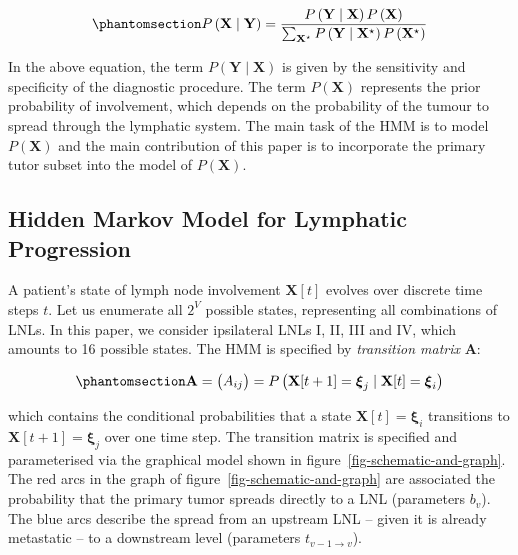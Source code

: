 \documentclass[11pt,twocolumn,twoside]{article}
\begin{document}
\begin{equation}\phantomsection\label{eq-bayes-law}{
P \left( \mathbf{X} \mid \mathbf{Y} \right) = \frac{P \left( \mathbf{Y} \mid \mathbf{X} \right) P \left( \mathbf{X} \right)}{\sum_{\mathbf{X}^\star} P \left( \mathbf{Y} \mid \mathbf{X}^\star \right) P \left( \mathbf{X}^\star \right)}
}\end{equation}

In the above equation, the term
\(P \left( \mathbf{Y} \mid \mathbf{X} \right)\) is given by the
sensitivity and specificity of the diagnostic procedure. The term
\(P \left( \mathbf{X} \right)\) represents the prior probability of
involvement, which depends on the probability of the tumour to spread
through the lymphatic system. The main task of the HMM is to model
\(P \left( \mathbf{X} \right)\) and the main contribution of this paper
is to incorporate the primary tutor subset into the model of
\(P \left( \mathbf{X} \right)\).

\subsection{Hidden Markov Model for Lymphatic
Progression}\label{sec-hmm}

A patient's state of lymph node involvement \(\mathbf{X}[t]\) evolves
over discrete time steps \(t\). Let us enumerate all \(2^V\) possible
states, representing all combinations of LNLs. In this paper, we
consider ipsilateral LNLs I, II, III and IV, which amounts to 16
possible states. The HMM is specified by \emph{transition matrix}
\(\mathbf{A}\):

\begin{equation}\phantomsection\label{eq-transition-matrix}{
\mathbf{A} = \begin{pmatrix} A_{ij} \end{pmatrix} = P \left( \mathbf{X}[t+1] = \boldsymbol{\xi}_j \mid \mathbf{X}[t] = \boldsymbol{\xi}_i \right)
}\end{equation}

which contains the conditional probabilities that a state
\(\mathbf{X}[t]=\boldsymbol{\xi}_i\) transitions to
\(\mathbf{X}[t+1]=\boldsymbol{\xi}_j\) over one time step. The
transition matrix is specified and parameterised via the graphical model
shown in figure~\ref{fig-schematic-and-graph}. The red arcs in the graph
of figure~\ref{fig-schematic-and-graph} are associated the probability
that the primary tumor spreads directly to a LNL (parameters \(b_v\)).
The blue arcs describe the spread from an upstream LNL -- given it is
already metastatic -- to a downstream level (parameters
\(t_{v-1 \rightarrow v}\)).
\end{document}
